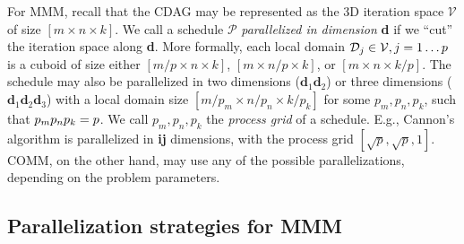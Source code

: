 \documentclass[sigplan,review,anonymous,10pt]{acmart}\settopmatter{printfolios=true,printccs=false,printacmref=false}
\newcommand\greg[1]{\textcolor{blue}{[Greg: #1]}}
\newcommand\mac[1]{\textcolor{red}{[Mac: #1]}}
\begin{document}
For MMM, recall that the CDAG may be represented as the 3D iteration space
$\mathcal{V}$ of size $[m \times n \times k]$. We call a schedule $\mathcal{P}$
\emph{parallelized in dimension} \textbf{d} if we ``cut'' the iteration space 
along \textbf{d}. More formally, each local domain $\mathcal{D}_j
\in \mathcal{V}, j =\nobreak 1 \dots p$ is a cuboid of size either $[m/p \times
n \times k]$,  $[m \times
n/p \times k]$, or  $[m \times
n \times k/p]$. 
The schedule may also be parallelized in two dimensions
($\mathbf{d}_1\mathbf{d}_2$) or three dimensions
($\mathbf{d}_1\mathbf{d}_2\mathbf{d}_3$) with a local domain size $[m/p_m \times
n/p_n \times k/p_k]$  for some $p_m, p_n, p_k$, such that
$p_m p_n p_k = \nobreak p$. We call $p_m, p_n, p_k$ the
\emph{process grid} of a schedule. E.g., Cannon's algorithm is parallelized in 
\textbf{ij} dimensions, with the process grid $[\sqrt{p}, \sqrt{p}, 1]$. COMM, 
on the other hand, may use any of the possible parallelizations, depending on 
the problem parameters.
%



\subsection{Parallelization strategies for MMM}
\end{document}
